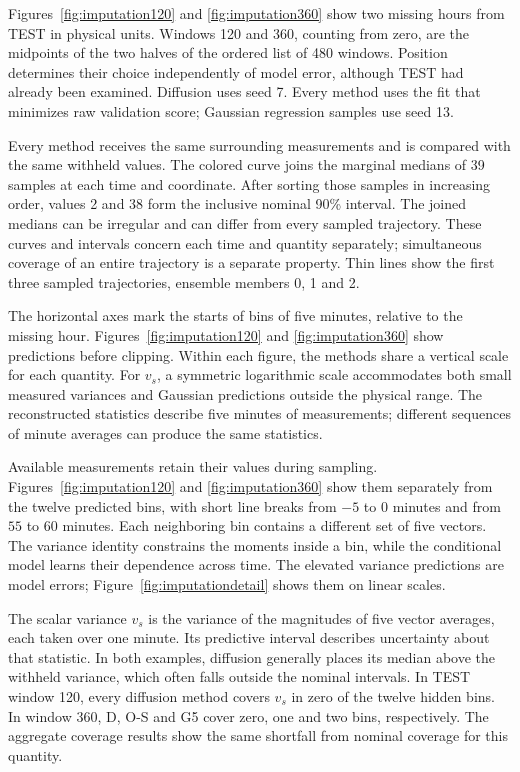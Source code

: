 \documentclass{article}
\begin{document}
Figures~\ref{fig:imputation120} and \ref{fig:imputation360} show two missing hours from TEST in physical units. Windows 120 and 360, counting from zero, are the midpoints of the two halves of the ordered list of 480 windows. Position determines their choice independently of model error, although TEST had already been examined. Diffusion uses seed 7. Every method uses the fit that minimizes raw validation score; Gaussian regression samples use seed 13.

Every method receives the same surrounding measurements and is compared with the same withheld values. The colored curve joins the marginal medians of 39 samples at each time and coordinate. After sorting those samples in increasing order, values 2 and 38 form the inclusive nominal 90\% interval. The joined medians can be irregular and can differ from every sampled trajectory. These curves and intervals concern each time and quantity separately; simultaneous coverage of an entire trajectory is a separate property. Thin lines show the first three sampled trajectories, ensemble members 0, 1 and 2.

The horizontal axes mark the starts of bins of five minutes, relative to the missing hour. Figures~\ref{fig:imputation120} and \ref{fig:imputation360} show predictions before clipping. Within each figure, the methods share a vertical scale for each quantity. For $v_s$, a symmetric logarithmic scale accommodates both small measured variances and Gaussian predictions outside the physical range. The reconstructed statistics describe five minutes of measurements; different sequences of minute averages can produce the same statistics.

Available measurements retain their values during sampling. Figures~\ref{fig:imputation120} and \ref{fig:imputation360} show them separately from the twelve predicted bins, with short line breaks from $-5$ to $0$ minutes and from $55$ to $60$ minutes. Each neighboring bin contains a different set of five vectors. The variance identity constrains the moments inside a bin, while the conditional model learns their dependence across time. The elevated variance predictions are model errors; Figure~\ref{fig:imputationdetail} shows them on linear scales.

The scalar variance $v_s$ is the variance of the magnitudes of five vector averages, each taken over one minute. Its predictive interval describes uncertainty about that statistic. In both examples, diffusion generally places its median above the withheld variance, which often falls outside the nominal intervals. In TEST window 120, every diffusion method covers $v_s$ in zero of the twelve hidden bins. In window 360, D, O-S and G5 cover zero, one and two bins, respectively. The aggregate coverage results show the same shortfall from nominal coverage for this quantity.
\end{document}
